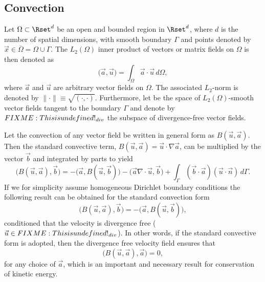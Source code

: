 \subsection{Convection}
\label{sec:Convection}
Let $\Omega \subset \Rset^d$ be an open and bounded region in $\Rset^d$, where $d$ is the number of spatial dimensions, with smooth boundary $\Gamma$ and points denoted by $\vec{x}\in \overline{\Omega}=\Omega \cup \Gamma$. The $L_2(\Omega)$ inner product of vectors or matrix fields on $\Omega$ is then denoted as
\begin{equation}
 \bigl( \vec{a},\vec{u} \bigr) = \int_{\Omega} \vec{a}\cdot \vec{u}\, d\Omega,
 \label{eq:L2}
\end{equation}
where $\vec{a}$ and $\vec{u}$ are arbitrary vector fields on $\Omega$. The associated $L_2$-norm is denoted by $\| \cdot \| \equiv \sqrt{\left( \cdot, \cdot \right)}$. Furthermore, let \Hset be the space of $L_2(\Omega)$-smooth vector fields tangent to the boundary $\Gamma$ and denote by $FIXME: This is undefined!_{div}$ the subspace of divergence-free vector fields.

Let the convection of any vector field be written in general form as $B(\vec{u},\vec{a})$. Then the standard convective term, $B(\vec{u},\vec{a}) = \vec{u}\cdot \nabla \vec{a} $, can be multiplied by the vector $\vec{b}$ and integrated by parts to yield
\begin{equation}
 \bigl( B(\vec{u}, \vec{a}), \vec{b}\bigr) = -\bigl( \vec{a}, B(\vec{u},\vec{b})\bigr) - \bigl( \vec{a} \nabla \cdot \vec{u} , \vec{b} \bigr) + \int_{\Gamma} \left(\vec{b} \cdot \vec{a} \right)\left(\vec{u} \cdot \vec{n} \right) \, d\Gamma.
\label{eq:Bu1}
\end{equation}
If we for simplicity assume homogeneous Dirichlet boundary conditions the following result can be obtained for the standard convection form
\begin{equation}
\bigl( B(\vec{u},\vec{a}), \vec{b} \bigr) = -\bigl( \vec{a}, B(\vec{u},\vec{b}) \bigr),
\label{eq:Bu2}
\end{equation}
conditioned that the velocity is divergence free ($\vec{u}\in FIXME: This is undefined!_{div}$). In other words, if the standard convective form is adopted, then the divergence free velocity field ensures that
\begin{equation}
\bigl( B(\vec{u}, \vec{a}), \vec{a} \bigr) = 0,
\label{eq:B0}
\end{equation}
for any choice of $\vec{a}$, which is an important and necessary result for conservation of kinetic energy.

